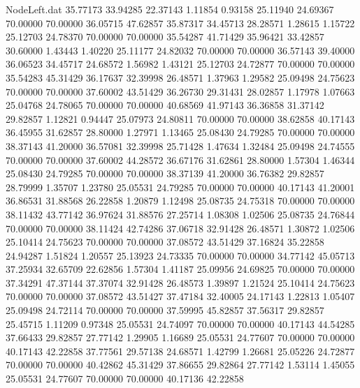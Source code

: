 \begin{filecontents}{NodeLeft.dat}
  35.77173   33.94285   22.37143     1.11854    0.93158   25.11940   24.69367   70.00000   70.00000   36.05715   47.62857
  35.87317   34.45713   28.28571     1.28615    1.15722   25.12703   24.78370   70.00000   70.00000   35.54287   41.71429
  35.96421   33.42857   30.60000     1.43443    1.40220   25.11177   24.82032   70.00000   70.00000   36.57143   39.40000
  36.06523   34.45717   24.68572     1.56982    1.43121   25.12703   24.72877   70.00000   70.00000   35.54283   45.31429
  36.17637   32.39998   26.48571     1.37963    1.29582   25.09498   24.75623   70.00000   70.00000   37.60002   43.51429
  36.26730   29.31431   28.02857     1.17978    1.07663   25.04768   24.78065   70.00000   70.00000   40.68569   41.97143
  36.36858   31.37142   29.82857     1.12821    0.94447   25.07973   24.80811   70.00000   70.00000   38.62858   40.17143
  36.45955   31.62857   28.80000     1.27971    1.13465   25.08430   24.79285   70.00000   70.00000   38.37143   41.20000
  36.57081   32.39998   25.71428     1.47634    1.32484   25.09498   24.74555   70.00000   70.00000   37.60002   44.28572
  36.67176   31.62861   28.80000     1.57304    1.46344   25.08430   24.79285   70.00000   70.00000   38.37139   41.20000
  36.76382   29.82857   28.79999     1.35707    1.23780   25.05531   24.79285   70.00000   70.00000   40.17143   41.20001
  36.86531   31.88568   26.22858     1.20879    1.12498   25.08735   24.75318   70.00000   70.00000   38.11432   43.77142
  36.97624   31.88576   27.25714     1.08308    1.02506   25.08735   24.76844   70.00000   70.00000   38.11424   42.74286
  37.06718   32.91428   26.48571     1.30872    1.02506   25.10414   24.75623   70.00000   70.00000   37.08572   43.51429
  37.16824   35.22858   24.94287     1.51824    1.20557   25.13923   24.73335   70.00000   70.00000   34.77142   45.05713
  37.25934   32.65709   22.62856     1.57304    1.41187   25.09956   24.69825   70.00000   70.00000   37.34291   47.37144
  37.37074   32.91428   26.48573     1.39897    1.21524   25.10414   24.75623   70.00000   70.00000   37.08572   43.51427
  37.47184   32.40005   24.17143     1.22813    1.05407   25.09498   24.72114   70.00000   70.00000   37.59995   45.82857
  37.56317   29.82857   25.45715     1.11209    0.97348   25.05531   24.74097   70.00000   70.00000   40.17143   44.54285
  37.66433   29.82857   27.77142     1.29905    1.16689   25.05531   24.77607   70.00000   70.00000   40.17143   42.22858
  37.77561   29.57138   24.68571     1.42799    1.26681   25.05226   24.72877   70.00000   70.00000   40.42862   45.31429
  37.86655   29.82864   27.77142     1.53114    1.45055   25.05531   24.77607   70.00000   70.00000   40.17136   42.22858

\end{filecontents}
